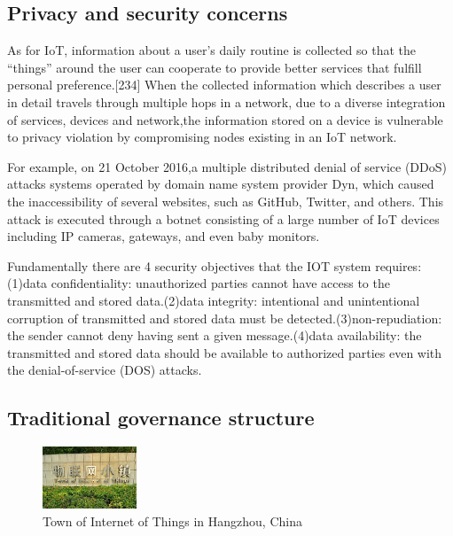 \documentclass[12pt, a4paper, twoside]{article}
\begin{document}
\subsection{Privacy and security concerns}
As for IoT, information about a user's daily routine is collected so that the “things” around the user can cooperate to provide better services that fulfill personal preference.[234] When the collected information which describes a user in detail travels through multiple hops in a network, due to a diverse integration of services, devices and network,the information stored on a device is vulnerable to privacy violation by compromising nodes existing in an IoT network.

For example, on 21 October 2016,a multiple distributed denial of service (DDoS) attacks systems operated by domain name system provider Dyn, which caused the inaccessibility of several websites, such as GitHub, Twitter, and others. This attack is executed through a botnet consisting of a large number of IoT devices including IP cameras, gateways, and even baby monitors.

Fundamentally there are 4 security objectives that the IOT system requires:(1)data confidentiality: unauthorized parties cannot have access to the transmitted and stored data.(2)data integrity: intentional and unintentional corruption of transmitted and stored data must be detected.(3)non-repudiation: the sender cannot deny having sent a given message.(4)data availability: the transmitted and stored data should be available to authorized parties even with the denial-of-service (DOS) attacks.

\subsection{Traditional governance structure}
\begin{figure} %
    \centering
    \includegraphics[width=0.25\textwidth]{toi}
    \caption{Town of Internet of Things in Hangzhou, China}
\end{figure}
\end{document}
